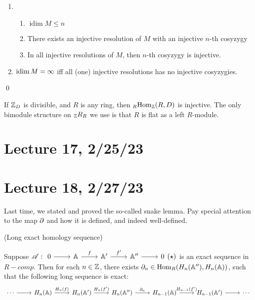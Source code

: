 \documentclass[x11names,reqno,14pt]{extarticle}
\newcommand{\A}{\mathbb{A}}
\DeclareMathOperator{\idim}{idim}
\begin{document}
\begin{enumerate}


\item 

\begin{enumerate}[label=(\alph*)]

\item $\idim M \leq n$ 

\item There exists an injective resolution of $M$ with an injective $n$-th cosyzygy

\item In all injective resolutions of $M$, then $n$-th cosyzygy is injective.

\end{enumerate}

\item $\idim M = \oo$ iff all (one) injective resolutions has no injective cosyzygies.

\end{enumerate}

\proof

\qed

If $\mathbb{Z}_D$ is divisible, and $R$ is any ring, then $_R{\mathrm{Hom}}_{\mathbb{Z}}(R, D)$ is injective. The only bimodule structure on $_{\mathbb{Z}} R_R$ we use is that $R$ is flat as a left $R$-module.

\section*{Lecture 17, 2/25/23}

\section*{Lecture 18, 2/27/23}

Last time, we stated and proved the so-called snake lemma. Pay special attention to the map $\partial$ and how it is defined, and indeed well-defined. 

\thm (Long exact homology sequence)

Suppose $\ms{A}:\exactshort{\A}{f}{\A'}{f'}{\A''}(\star)$ is an exact sequence in $R-comp$. Then for each $n\in\mathbb{Z}$, there exists $\del_n\in\Hom_R(H_n(\A''), H_n(\A))$, such that the following long sequence is exact:
\[
\begin{tikzcd}
\cdots\ar[r]&H_n(\A)\ar[r, "H_n(f)"] & H_n(\A') \ar[r, "H_n(f')"] & H_n(\A'')\ar[r, "\del_n"] & H_{n - 1}(\A) \ar[r, "H_{n - 1}(f')"] & H_{n - 1}(\A') \ar[r] & \cdots
\end{tikzcd}
\]
\end{document}
